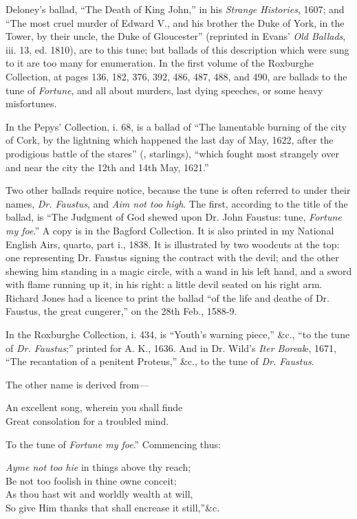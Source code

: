 Deloney’s ballad, “The Death of King John,” in his \textit{Strange Histories}, 1607;
and “The most cruel murder of Edward V., and his brother the Duke of York,
in the Tower, by their uncle, the Duke of Gloucester” (reprinted in Evans’ \textit{Old
Ballads}, iii. 13, ed. 1810), are to this tune; but ballads of this description which
were sung to it are too many for enumeration. In the first volume of the Roxburghe
Collection, at pages 136, 182, 376, 392, 486, 487, 488, and 490, are
ballads to the tune of \textit{Fortune}, and all about murders, last dying speeches, or some
heavy misfortunes.

In the Pepys’ Collection, i. 68, is a ballad of “The lamentable burning of the
city of Cork, by the lightning which happened the last day of May, 1622, after
the prodigious battle of the stares” (\ie, starlings), “which fought most strangely
over and near the city the 12th and 14th May, 1621.”

Two other ballads require notice, because the tune is often referred to under
their names, \textit{Dr. Faustus}, and \textit{Aim not too high}. The first, according to the title
of the ballad, is “The Judgment of God shewed upon Dr. John Faustus: tune,
\textit{Fortune my foe}.” A copy is in the Bagford Collection.\scfootnote
{It is also printed in my National English Airs, quarto, part i., 1838.}
It is illustrated by two
woodcuts at the top: one representing Dr. Faustus signing the contract with the
devil; and the other shewing him standing in a magic circle, with a wand in his
left hand, and a sword with flame running up it, in his right: a little devil
seated on his right arm. Richard Jones had a licence to print the ballad “of the
life and deathe of Dr. Faustus, the great cungerer,” on the 28th Feb., 1588-9.

In the Roxburghe Collection, i. 434, is “Youth’s warning piece,” \&c., “to the
tune of \textit{Dr. Faustus};” printed for A. K., 1636. And in Dr. Wild’s\textit{ Iter
Boreal}e, 1671, “The recantation of a penitent Proteus,” \&c., to the tune of
\textit{Dr. Faustus}.
\pagebreak

The other name is derived from—
\settowidth{\versewidth}{So give Him thanks that shall encrease it still,”}
\begin{scverse}
An excellent song, wherein you shall finde\\
Great consolation for a troubled mind.
\end{scverse}
To the tune of \textit{Fortune my foe}.” Commencing thus:
\begin{scverse}
\textit{Ayme not too hie} in things above thy reach;\\
Be not too foolish in thine owne conceit;\\
As thou hast wit and worldly wealth at will,\\
So give Him thanks that shall encrease it still,”\&c.
\end{scverse}


